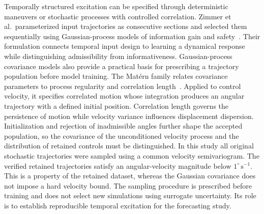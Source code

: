 Temporally structured excitation can be specified through deterministic maneuvers or stochastic processes with controlled correlation. Zimmer et al.\ parameterized input trajectories as consecutive sections and selected them sequentially using Gaussian-process models of information gain and safety~\cite{zimmer2018safe}. Their formulation connects temporal input design to learning a dynamical response while distinguishing admissibility from informativeness. Gaussian-process covariance models also provide a practical basis for prescribing a trajectory population before model training. The Mat\'ern family relates covariance parameters to process regularity and correlation length~\cite{porcu2024matern}. Applied to control velocity, it specifies correlated motion whose integration produces an angular trajectory with a defined initial position. Correlation length governs the persistence of motion while velocity variance influences displacement dispersion. Initialization and rejection of inadmissible angles further shape the accepted population, so the covariance of the unconditioned velocity process and the distribution of retained controls must be distinguished. In this study all original stochastic trajectories were sampled using a common velocity semivariogram. The verified retained trajectories satisfy an angular-velocity magnitude below $1^\circ\,\mathrm{s}^{-1}$. This is a property of the retained dataset, whereas the Gaussian covariance does not impose a hard velocity bound. The sampling procedure is prescribed before training and does not select new simulations using surrogate uncertainty. Its role is to establish reproducible temporal excitation for the forecasting study.

